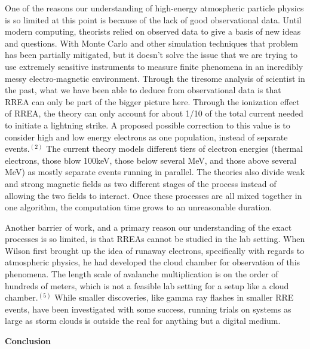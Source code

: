 \documentclass[11pt]{article}
\begin{document}
    One of the reasons our understanding of high-energy atmospheric particle physics is so limited at this point is because of the lack of good observational data. Until modern computing, theorists relied on observed data to give a basis of new ideas and questions. With Monte Carlo and other simulation techniques that problem has been partially mitigated, but it doesn't solve the issue that we are trying to use extremely sensitive instruments to measure finite phenomena in an incredibly messy electro-magnetic environment. Through the tiresome analysis of scientist in the past, what we have been able to deduce from observational data is that RREA can only be part of the bigger picture here. Through the ionization effect of RREA, the theory can only account for about 1/10 of the total current needed to initiate a lightning strike. A proposed possible correction to this value is to consider high and low energy electrons as one population, instead of separate events.$^{(2)}$ The current theory models different tiers of electron energies (thermal electrons, those blow 100keV, those below several MeV, and those above several MeV) as mostly separate events running in parallel. The theories also divide weak and strong magnetic fields as two different stages of the process instead of allowing the two fields to interact. Once these processes are all mixed together in one algorithm, the computation time grows to an unreasonable duration. 
    
    Another barrier of work, and a primary reason our understanding of the exact processes is so limited, is that RREAs cannot be studied in the lab setting. When Wilson first brought up the idea of runaway electrons, specifically with regards to atmospheric physics, he had developed the cloud chamber for observation of this phenomena. The length scale of avalanche multiplication is on the order of hundreds of meters, which is not a feasible lab setting for a setup like a cloud chamber.$^{(5)}$ While smaller discoveries, like gamma ray flashes in smaller RRE events, have been investigated with some success, running trials on systems as large as storm clouds is outside the real for anything but a digital medium. 
    \newline
    

    \noindent
{\bf \LARGE Conclusion}
    
\end{document}
